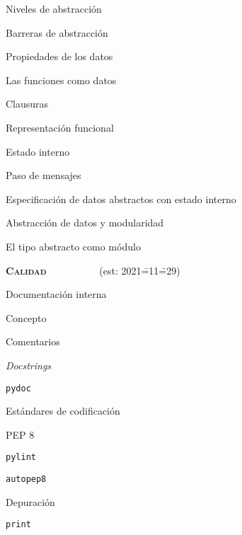 \begin{longenum}
\begin{longenum}
\begin{longenum}
            \item Niveles de abstracción
            \item Barreras de abstracción
            \item Propiedades de los datos
        \end{longenum}
        \item Las funciones como datos
        \begin{longenum}
            \item Clausuras
            \item Representación funcional
            \item Estado interno
            \item Paso de mensajes
            \item Especificación de datos abstractos con estado interno
        \end{longenum}
        \item Abstracción de datos y modularidad
        \begin{longenum}
            \item El tipo abstracto como módulo
        \end{longenum}
    \end{longenum}
    \item \textbf{\textsc{Calidad}} \ \ \ \ \ \ \ \ \ \ (est: 2021\==11\==29)
    \begin{longenum}
        \item Documentación interna
        \begin{longenum}
            \item Concepto
            \item Comentarios
            \item \textit{Docstrings}
            \item \texttt{pydoc}
            \item Estándares de codificación
            \begin{longenum}
                \item PEP 8
                \item \texttt{pylint}
                \item \texttt{autopep8}
            \end{longenum}
        \end{longenum}
        \item Depuración
        \begin{longenum}
            \item \texttt{print}

\end{longenum}
\end{longenum}
\end{longenum}
